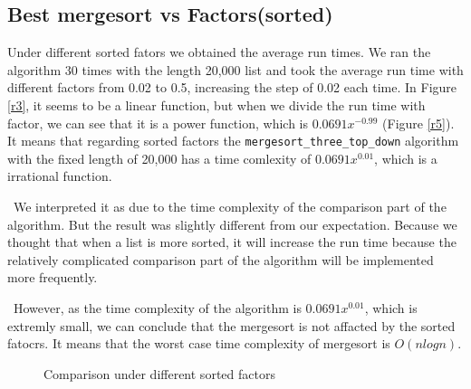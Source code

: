 \documentclass[12pt]{article}
\begin{document}
\newpage

\subsection{Best mergesort vs Factors(sorted)}
Under different sorted fators we obtained the average run times. 
We ran the algorithm 30 times with the length 20,000 list and took the 
average run time with different factors from 0.02 to 0.5, 
increasing the step of 0.02 each time. In Figure \ref{r3}, it seems to
be a linear function, but when we divide the run time with factor, 
 we can see that it is a power function, which is $0.0691x^{-0.99}$ 
 (Figure \ref{r5}).
It means that regarding sorted factors the 
\verb|mergesort_three_top_down| algorithm with the
fixed length of 20,000 has a time comlexity of $0.0691x^{0.01}$, 
which is a irrational function.

~\newline\noindent We interpreted it as due to the time
complexity of the comparison part of the algorithm. But the result was
slightly different from our expectation. Because we thought that
when a list is more sorted, it will increase the run time because
the relatively complicated comparison part of the algorithm will 
be implemented more frequently. 

~\newline\noindent However, as the time complexity of the algorithm
is $0.0691x^{0.01}$, which is extremly small, we can conclude that
the mergesort is not affacted by the sorted fatocrs. 
It means that the worst case time complexity of mergesort is
$O(nlogn)$.

\begin{figure}[hbt!]
  \centering
  \hfill
  \caption{Comparison under different sorted factors}
\end{figure}
\end{document}
